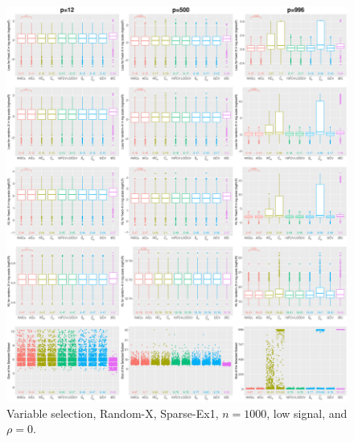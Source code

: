 \begin{figure}[!ht]
\centering
\includegraphics[width=\textwidth]{figures/supplement/randomx/subset_selection/Sparse-Ex1_n1000_lsnr_rho0.eps}
\caption{Variable selection, Random-X, Sparse-Ex1, $n=1000$, low signal, and $\rho=0$.}
\end{figure}
\clearpage

